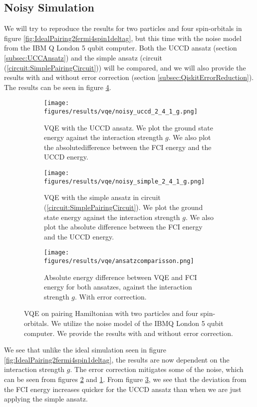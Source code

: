 \subsection{Noisy Simulation}
\label{subsubsec:ResVQEPairingNoisy}
We will try to reproduce the results for two particles and four spin-orbitals in figure \ref{fig:IdealPairing2fermi4spin1deltag}, but this time with the noise model from the IBM Q London 5 qubit computer. Both the UCCD ansatz (section \ref{subsec:UCCAnsatz}) and the simple ansatz (circuit (\ref{circuit:SimplePairingCircuit})) will be compared, and we will also provide the results with and without error correction (section \ref{subsec:QiskitErrorReduction}). The results can be seen in figure \ref{fig:NoisyVQE}.
\begin{figure}[H]
\begin{subfigure}{.5\textwidth}
  \centering
  \texttt{[image: figures/results/vqe/noisy\_uccd\_2\_4\_1\_g.png]}  
  \caption{VQE with the UCCD ansatz. We plot the ground state energy against the interaction strength $g$. We also plot the absolute\newline difference between the FCI energy and the UCCD energy.}
  \label{fig:NoisyPairingUCCD2fermi4spin1deltag}
\end{subfigure}
\begin{subfigure}{.5\textwidth}
  \centering
  \texttt{[image: figures/results/vqe/noisy\_simple\_2\_4\_1\_g.png]}  
  \caption{ VQE with the simple ansatz in circuit (\ref{circuit:SimplePairingCircuit}). We plot the ground state energy against the interaction strength $g$. We also plot the absolute difference between the FCI energy and the UCCD energy.}
  \label{fig:NoisyPairingsimple2fermi4spin1deltag}
\end{subfigure}
\newline
\begin{subfigure}{.5\textwidth}
  \centering
  \texttt{[image: figures/results/vqe/ansatzcomparisson.png]}  
  \caption{Absolute energy difference between VQE and FCI energy for both ansatzes, against the interaction strength $g$. With error correction. }
  \label{fig:NoisyPairingAnsatzCompare2fermi4spin1deltag}
\end{subfigure}
\caption{VQE on pairing Hamiltonian with two particles and four spin-orbitals. We utilize the noise model of the IBMQ London 5 qubit computer. We provide the results with and without error correction.}
\label{fig:NoisyVQE}
\end{figure}
We see that unlike the ideal simulation seen in figure \ref{fig:IdealPairing2fermi4spin1deltag}, the results are now dependent on the interaction strength $g$. The error correction mitigates some of the noise, which can be seen from figures \ref{fig:NoisyPairingsimple2fermi4spin1deltag} and \ref{fig:NoisyPairingUCCD2fermi4spin1deltag}. From figure \ref{fig:NoisyPairingAnsatzCompare2fermi4spin1deltag}, we see that the deviation from the FCI energy increases quicker for the UCCD ansatz than when we are just applying the simple ansatz.


